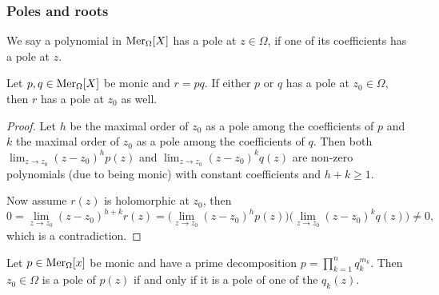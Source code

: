 \subsubsection{Poles and roots}
\begin{definition}
We say a polynomial in $\operatorname{Mer}_\Omega[X]$ has a pole at $z\in \Omega$, if one of its coefficients has a pole at $z$.
\end{definition}

\begin{lemma} \label{polesProductPolynomial}
Let $p,q\in \operatorname{Mer}_\Omega[X]$ be monic and $r = pq$. If either $p$ or $q$ has a pole at $z_0\in \Omega$, then $r$ has a pole at $z_0$ as well.
\end{lemma}
\begin{proof}
Let $h$ be the maximal order of $z_0$ as a pole among the coefficients of $p$ and $k$ the maximal order of $z_0$ as a pole among the coefficients of $q$. Then both $\lim_{z\to z_0}(z-z_0)^h p(z)$ and $\lim_{z\to z_0}(z-z_0)^k q(z)$ are non-zero polynomials (due to being monic) with constant coefficients and $h+k \geq 1$. 

Now assume $r(z)$ is holomorphic at $z_0$, then
\[ 0 = \lim_{z\to z_0}(z-z_0)^{h+k}r(z) = \Big(\lim_{z\to z_0}(z-z_0)^h p(z)\Big)\Big(\lim_{z\to z_0}(z-z_0)^k q(z)\Big) \neq 0, \]
which is a contradiction.
\end{proof}
\begin{corollary}
Let $p \in \operatorname{Mer}_\Omega[x]$ be monic and have a prime decomposition $p = \prod_{k=1}^nq_k^{m_k}$. Then $z_0\in \Omega$ is a pole of $p(z)$ \textup{if and only if} it is a pole of one of the $q_k(z)$.
\end{corollary}


